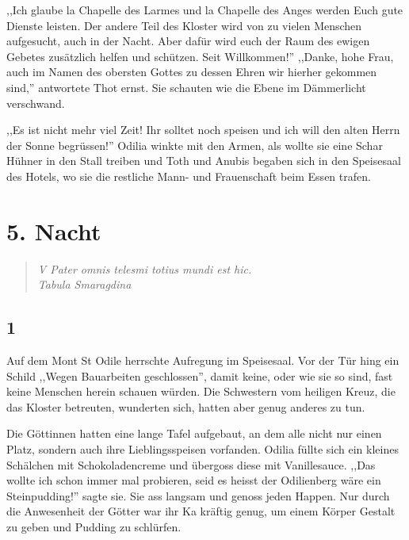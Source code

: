 \documentclass[11pt,titlepage,a5paper]{book}
\begin{document}
,,Ich glaube la Chapelle des Larmes und la Chapelle des Anges werden Euch gute Dienste leisten. Der andere Teil des Kloster wird von zu vielen Menschen aufgesucht, auch in der Nacht. Aber dafür wird euch der Raum des ewigen Gebetes zusätzlich helfen und schützen. Seit Willkommen!'' ,,Danke, hohe Frau, auch im Namen des obersten Gottes zu dessen Ehren wir hierher gekommen sind,'' antwortete Thot ernst. Sie schauten wie die Ebene im Dämmerlicht verschwand.

,,Es ist nicht mehr viel Zeit! Ihr solltet noch speisen und ich will den alten Herrn der Sonne begrüssen!'' Odilia winkte mit den Armen, als wollte sie eine Schar Hühner in den Stall treiben und Toth und Anubis begaben sich in den Speisesaal des Hotels, wo sie die restliche Mann- und Frauenschaft beim Essen trafen.


\chapter*{5. Nacht}

\begin{quotation}

\emph{V Pater omnis telesmi totius mundi est hic. \\Tabula Smaragdina}

\end{quotation}

\section*{1}

Auf dem Mont St Odile herrschte Aufregung im Speisesaal. Vor der Tür hing ein Schild ,,Wegen Bauarbeiten geschlossen'', damit keine, oder wie sie so sind, fast keine Menschen herein schauen würden. Die Schwestern vom heiligen Kreuz, die das Kloster betreuten, wunderten sich, hatten aber genug anderes zu tun.

Die Göttinnen hatten eine lange Tafel aufgebaut, an dem alle nicht nur einen Platz, sondern auch ihre Lieblingsspeisen vorfanden. Odilia füllte sich ein kleines Schälchen mit Schokoladencreme und übergoss diese mit Vanillesauce. ,,Das wollte ich schon immer mal probieren, seid es heisst der Odilienberg wäre ein Steinpudding!'' sagte sie. Sie ass langsam und genoss jeden Happen. Nur durch die Anwesenheit der Götter war ihr Ka kräftig genug, um einem Körper Gestalt zu geben und Pudding zu schlürfen.
\end{document}
